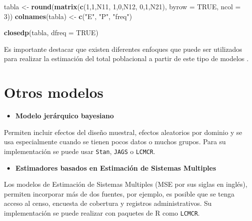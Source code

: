 \documentclass[
  12pt,
]{book}
\newenvironment{Shaded}{\begin{snugshade}}{\end{snugshade}}
\newcommand{\AttributeTok}[1]{\textcolor[rgb]{0.13,0.29,0.53}{#1}}
\newcommand{\ConstantTok}[1]{\textcolor[rgb]{0.56,0.35,0.01}{#1}}
\newcommand{\DecValTok}[1]{\textcolor[rgb]{0.00,0.00,0.81}{#1}}
\newcommand{\FunctionTok}[1]{\textcolor[rgb]{0.13,0.29,0.53}{\textbf{#1}}}
\newcommand{\NormalTok}[1]{#1}
\newcommand{\OtherTok}[1]{\textcolor[rgb]{0.56,0.35,0.01}{#1}}
\newcommand{\StringTok}[1]{\textcolor[rgb]{0.31,0.60,0.02}{#1}}
\providecommand{\tightlist}{%
  \setlength{\itemsep}{0pt}\setlength{\parskip}{0pt}}
\begin{document}
\begin{Shaded}
\begin{Highlighting}[]
\NormalTok{tabla }\OtherTok{\textless{}{-}} \FunctionTok{round}\NormalTok{(}\FunctionTok{matrix}\NormalTok{(}\FunctionTok{c}\NormalTok{(}\DecValTok{1}\NormalTok{,}\DecValTok{1}\NormalTok{,N11,}
                        \DecValTok{1}\NormalTok{,}\DecValTok{0}\NormalTok{,N12,}
                        \DecValTok{0}\NormalTok{,}\DecValTok{1}\NormalTok{,N21), }\AttributeTok{byrow =} \ConstantTok{TRUE}\NormalTok{, }\AttributeTok{ncol =} \DecValTok{3}\NormalTok{))}
\FunctionTok{colnames}\NormalTok{(tabla) }\OtherTok{\textless{}{-}} \FunctionTok{c}\NormalTok{(}\StringTok{"E"}\NormalTok{, }\StringTok{"P"}\NormalTok{, }\StringTok{"freq"}\NormalTok{)}

\FunctionTok{closedp}\NormalTok{(tabla, }\AttributeTok{dfreq =} \ConstantTok{TRUE}\NormalTok{)}
\end{Highlighting}
\end{Shaded}

Es importante destacar que existen diferentes enfoques que puede ser utilizados para realizar la estimación del total poblacional a partir de este tipo de modelos \citep{otis1978statistical, rivest2007applications, baillargeon2007rcapture, rivest2014capture}.

\section{Otros modelos}\label{otros-modelos}

\begin{itemize}
\tightlist
\item
  \textbf{Modelo jerárquico bayesiano}
\end{itemize}

Permiten incluir efectos del diseño muestral, efectos aleatorios por dominio y se usa especialmente cuando se tienen pocos datos o muchos grupos. Para su implementación se puede usar \texttt{Stan}, \texttt{JAGS} o \texttt{LCMCR}.

\begin{itemize}
\tightlist
\item
  \textbf{Estimadores basados en Estimación de Sistemas Multiples}
\end{itemize}

Los modelos de Estimación de Sistemas Multiples (MSE por sus siglas en inglés), permiten incorporar más de dos fuentes, por ejemplo, es posible que se tenga acceso al censo, encuesta de cobertura y registros administrativos. Su implementación se puede realizar con paquetes de R como \texttt{LCMCR}.
\end{document}
